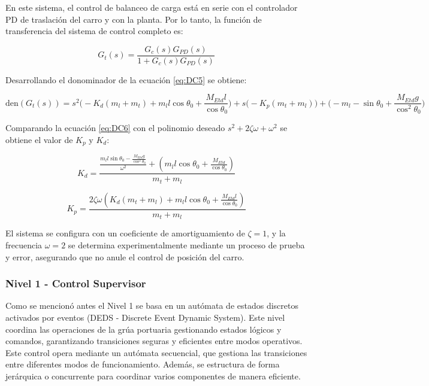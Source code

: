 \documentclass{article}
\begin{document}
        En este sistema, el control de balanceo de carga está en serie con el controlador PD de traslación del carro y con la planta. Por lo tanto, la función de transferencia del sistema de control completo es:

        \begin{equation} \label{eq:DC5}
            G_t(s) = \frac{G_{c}(s) G_{PD}(s)}{1 + G_{c}(s) G_{PD}(s)}
        \end{equation}

        Desarrollando el donominador de la ecuación \ref{eq:DC5} se obtiene:

        
        \begin{equation} \label{eq:DC6}
            \text{den}(G_t(s)) = s^2\bigg(-K_d(m_l+m_t)+m_ll\cos{\theta_0}+\frac{M_{Etd}l}{\cos{\theta_0}}\bigg)+s\bigg(-K_p(m_t+m_l)\bigg)+\bigg( -m_l-\sin{\theta_0}+\frac{M_{Etd}g}{\cos^2{\theta_0}}\bigg) 
        \end{equation}

        Comparando la ecuación \ref{eq:DC6} con el polinomio deseado \(s^2+2\zeta\omega+\omega^2\) se obtiene el valor de \(K_p\) y \(K_d\):

        \begin{equation} \label{eq:DC7}
            K_d=\frac{\frac{m_ll\sin{\theta_0}-\frac{M_{Etd}g}{\cos^2{\theta_0}}}{\omega^2}+\left(m_ll\cos{\theta_0}+\frac{M_{Etd}}{\cos{\theta_0}}\right)}{m_t+m_l}
        \end{equation}

        \begin{equation} \label{eq:DC8}
            K_p=\frac{2\zeta\omega\left(K_d(m_t+m_l)+m_ll\cos{\theta_0}+\frac{M_{Etd}l}{\cos{\theta_0}}\right)}{m_t+m_l}
        \end{equation}

        El sistema se configura con un coeficiente de amortiguamiento de \(\zeta = 1\), y la frecuencia \(\omega = 2\) se determina experimentalmente mediante un proceso de prueba y error, asegurando que no anule el control de posición del carro.


        

        \subsubsection{Nivel 1 - Control Supervisor}

        Como se mencionó antes el Nivel 1 se basa en un autómata de estados discretos activados por eventos (DEDS - Discrete Event Dynamic System). Este nivel coordina las operaciones de la grúa portuaria gestionando estados lógicos y comandos, garantizando transiciones seguras y eficientes entre modos operativos. Este control opera mediante un autómata secuencial, que gestiona las transiciones entre diferentes modos de funcionamiento. Además, se estructura de forma jerárquica o concurrente para coordinar varios componentes de manera eficiente.
\end{document}
